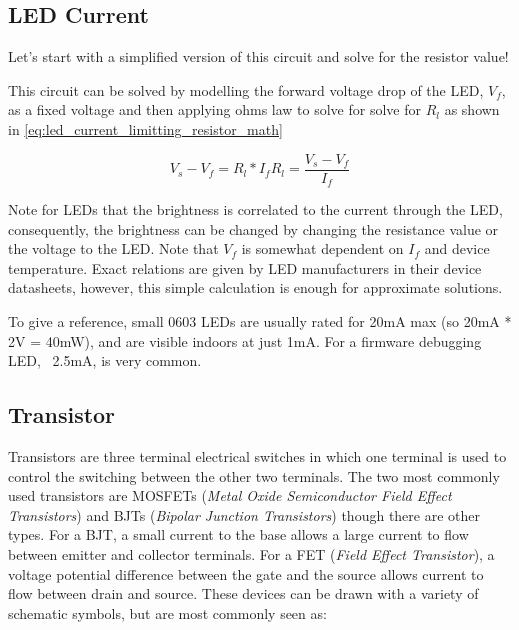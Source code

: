 \documentclass[main.tex]{subfiles}
\begin{document}
\subsection{LED Current}
Let's start with a simplified version of this circuit and solve for  the resistor value! 


This circuit can be solved by modelling the forward voltage drop of the LED, $V_f$, as a fixed voltage and then applying ohms law to solve for solve for $R_l$ as shown in \eqref{eq:led_current_limitting_resistor_math}

\begin{equation}
    V_s - V_f = R_l * I _f
    R_l = \frac{V_s - V_f}{I_f}
    \label{eq:led_current_limitting_resistor_math}
\end{equation}

Note for LEDs that the brightness is correlated to the current through the LED, consequently, the brightness can be changed by changing the resistance value or the voltage to the LED. Note that $V_f$ is somewhat dependent on $I_f$ and device temperature. Exact relations are given by LED manufacturers in their device datasheets, however, this simple calculation is enough for approximate solutions. 

To give a reference, small 0603 LEDs are usually rated for 20mA max (so 20mA * 2V = 40mW), and are visible indoors at just 1mA. For a firmware debugging LED, ~2.5mA, is very common. 

\subsection{Transistor}
Transistors are three terminal electrical switches in which one terminal is used to control the switching between the other two terminals. The two most commonly used transistors are MOSFETs (\textit{Metal Oxide Semiconductor Field Effect Transistors}) and BJTs (\textit{Bipolar Junction Transistors}) though there are other types. For a BJT, a small current to the base allows a large current to flow between emitter and collector terminals. For a FET (\textit{Field Effect Transistor}), a voltage potential difference between the gate and the source allows current to flow between drain and source. These devices can be drawn with a variety of schematic symbols, but are most commonly seen as:

\end{document}
